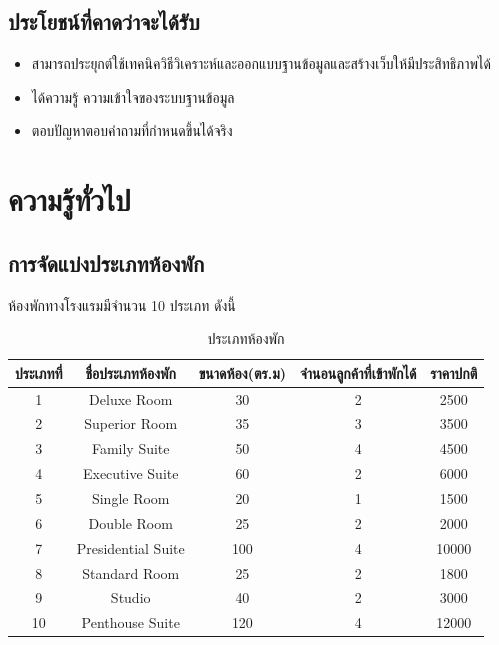 \documentclass{report}
\begin{document}
\section{ประโยชน์ที่คาดว่าจะได้รับ}
\begin{itemize}
    \item{สามารถประยุกต์ใช้เทคนิควิธีวิเคราะห์และออกแบบฐานข้อมูลและสร้างเว็บให้มีประสิทธิภาพได้}
    \item{ได้ความรู้ ความเข้าใจของระบบฐานข้อมูล}
    \item{ตอบปัญหาตอบคำถามที่กำหนดขึ้นได้จริง}
\end{itemize}
 
\chapter{ความรู้ทั่วไป}

\section{การจัดแบ่งประเภทห้องพัก}
ห้องพักทางโรงแรมมีจำนวน 10 ประเภท ดังนี้ \par

\begin{table}[h!]
\centering
\begin{tabular}{|c|c|c|c|c|}
\hline
ประเภทที่ & ชื่อประเภทห้องพัก & ขนาดห้อง(ตร.ม) & จำนอนลูกค้าที่เข้าพักได้ & ราคาปกติ \\
\hline
1 & Deluxe Room & 30 & 2 & 2500 \\
2 & Superior Room & 35 & 3 & 3500 \\
3 & Family Suite & 50 & 4 & 4500 \\
4 & Executive Suite & 60 & 2 & 6000 \\
5 & Single Room & 20 & 1 & 1500 \\
6 & Double Room & 25 & 2 & 2000 \\
7 & Presidential Suite & 100 & 4 & 10000 \\
8 & Standard Room & 25 & 2 & 1800 \\
9 & Studio & 40 & 2 & 3000 \\
10 & Penthouse Suite & 120 & 4 & 12000 \\
\hline
\end{tabular}
\caption{ประเภทห้องพัก}
\label{table:1}
\end{table}
\end{document}
